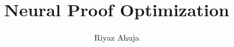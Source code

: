 \documentclass[letterpaper,12pt]{article} %
\title{Neural Proof Optimization}
\author{Riyaz Ahuja}        %
\theoremstyle{definition}
\theoremstyle{remark}
\begin{document}

\frontmatter                       %
\maketitle\newpage                 %



% 

\begin{acknowledgments}

\end{acknowledgments} \newpage


\clearpage
\begin{abstract}

\end{abstract} \newpage



\tableofcontents\newpage        %

\listoffigures\newpage          %

\listoftables\newpage           %



\bodymatter     %
\end{document}

